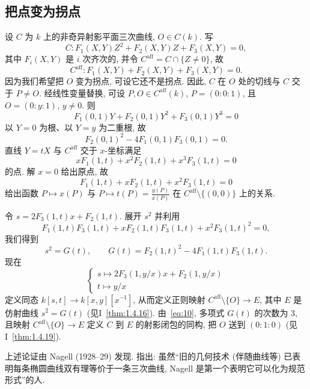 \subsection*{把点变为拐点}
设 $C$ 为 $k$ 上的非奇异射影平面三次曲线, $O\in C(k)$. 写
\[
C\colon F_1(X,Y)Z^2 + F_2(X,Y)Z + F_3(X,Y) = 0,
\]
其中 $F_i(X,Y)$ 是 $i$ 次齐次的, 并令 $C^{\mathrm{aff}} = C\cap\{Z\neq 0\}$, 故
\[
C^{\mathrm{aff}}\colon F_1(X,Y) + F_2(X,Y) + F_3(X,Y) = 0.
\]
因为我们希望把 $O$ 变为拐点, 可设它还不是拐点. 因此, $C$ 在 $O$ 处的切线与 $C$ 交于 $P\neq O$. 经线性变量替换, 可设 $P, O\in C^{\mathrm{aff}}(k)$, $P = (0:0:1)$, 且 $O = (0:y:1)$, $y\neq 0$. 则
\[
F_1(0,1)Y + F_2(0,1)Y^2 + F_3(0,1)Y^3 = 0
\]
以 $Y = 0$ 为根、以 $Y = y$ 为二重根, 故
\begin{equation} \label{eq:10}
F_2(0,1)^2 - 4F_1(0,1)F_3(0,1) = 0.
\tag{10}
\end{equation}
直线 $Y = tX$ 与 $C^{\mathrm{aff}}$ 交于 $x$-坐标满足
\[
xF_1(1,t) + x^2F_2(1,t) + x^3F_3(1,t) = 0
\]
的点. 解 $x = 0$ 给出原点, 故
\[
F_1(1,t) + xF_2(1,t) + x^2F_3(1,t) = 0
\]
给出函数 $P\mapsto x(P)$ 与 $P\mapsto t(P) = \frac{y(P)}{x(P)}$ 在 $C^{\mathrm{aff}}\setminus\{(0,0)\}$ 上的关系.

令 $s = 2F_3(1,t)x + F_2(1,t)$. 展开 $s^2$ 并利用
\[
F_1(1,t)F_3(1,t) + xF_2(1,t)F_3(1,t) + x^2F_3(1,t)^2 = 0,
\]
我们得到
\[
s^2 = G(t), \qquad
G(t) = F_2(1,t)^2 - 4F_1(1,t)F_3(1,t).
\]
现在
\[
\begin{cases}
s \mapsto 2F_3(1,y/x)x + F_2(1,y/x)\\
t \mapsto y/x
\end{cases}
\]
定义同态 $k[s,t]\to k[x,y][x^{-1}]$, 从而定义正则映射 $C^{\mathrm{aff}}\setminus\{O\}\to E$, 其中 $E$ 是仿射曲线 $s^2 = G(t)$ (见I~\ref{thm:1.4.16}). 由~\eqref{eq:10}, 多项式 $G(t)$ 的次数为 $3$, 且映射 $C^{\mathrm{aff}}\setminus\{O\}\to E$ 定义 $C$ 到 $E$ 的射影闭包的同构, 把 $O$ 送到 $(0:1:0)$ (见I~\ref{thm:1.4.19}).

\begin{remarkstar}
上述论证由 Nagell (1928--29) 发现. \cite[p.~34]{cassels1991} 指出: 虽然``旧的几何技术 (伴随曲线等) 已表明每条椭圆曲线双有理等价于一条三次曲线, Nagell 是第一个表明它可以化为规范形式''的人.
\end{remarkstar}

